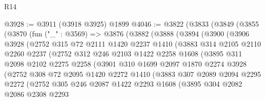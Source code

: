 \begin{lexlean}{R14}
\begin{coremodule}
@3928 := @3911 (@3918 @3925) @1899
@4046 := @3822
    (@3833
      (@3849
        (@3855
          (@3870
            (fun ("_" : @3569) =>
            @3876
              (@3882
                (@3888
                  (@3894
                    (@3900
                      (@3906
                        @3928
                        (@2752
                          @315
                          @72
                          @2111
                          @1420
                          @2237
                          @1410
                          (@3883
                            @314
                            @2105
                            @2110
                            @2260
                            @2237
                            (@2752
                              @312
                              @246
                              @2103
                              @1422
                              @2258
                              @1608
                              (@3895
                                @311
                                @2098
                                @2102
                                @2275
                                @2258
                                (@3901
                                  @310
                                  @1699
                                  @2097
                                  @1870
                                  @2274
                                  @3928
                                  (@2752
                                    @308
                                    @72
                                    @2095
                                    @1420
                                    @2272
                                    @1410
                                    (@3883
                                      @307
                                      @2089
                                      @2094
                                      @2295
                                      @2272
                                      (@2752
                                        @305
                                        @246
                                        @2087
                                        @1422
                                        @2293
                                        @1608
                                        (@3895
                                          @304
                                          @2082
                                          @2086
                                          @2308
                                          @2293

\end{coremodule}
\end{lexlean}
